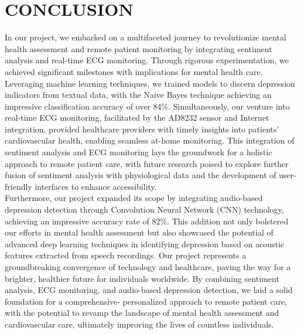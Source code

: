 \chapter{CONCLUSION}
In our project, we embarked on a multifaceted journey to revolutionize mental health assessment and remote patient monitoring by integrating sentiment analysis and real-time ECG monitoring. Through rigorous experimentation, we achieved significant milestones with implications for mental health care. Leveraging machine learning techniques, we trained models to discern depression indicators from textual data, with the Naive Bayes technique achieving an impressive classification accuracy of over 84\%. Simultaneously, our venture into real-time ECG monitoring, facilitated by the AD8232 sensor and Internet integration\cite{yeh2021integrating}, provided healthcare providers with timely insights into patients' cardiovascular health, enabling seamless at-home monitoring. This integration of sentiment analysis and ECG monitoring lays the groundwork for a holistic approach to remote patient care, with future research poised to explore further fusion of sentiment analysis with physiological data and the development of user-friendly interfaces to enhance accessibility.
\\
Furthermore, our project expanded its scope by integrating audio-based depression detection through Convolution Neural Network\cite{vazquez2020automatic} (CNN) technology, achieving an impressive accuracy rate of 82\%. This addition not only bolstered our efforts in mental health assessment but also showcased the potential of advanced deep learning techniques in identifying depression based on acoustic features extracted from speech recordings. Our project represents a groundbreaking convergence of technology and healthcare, paving the way for a brighter, healthier future for individuals worldwide. By combining sentiment analysis, ECG monitoring, and audio-based depression detection, we laid a solid foundation for a comprehensive- personalized approach to remote patient care, with the potential to revamp the landscape of mental health assessment and cardiovascular care, ultimately improving the lives of countless individuals.